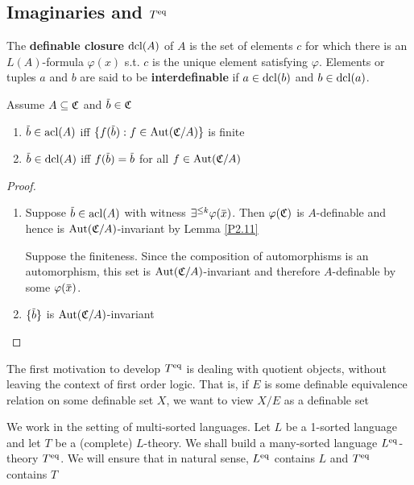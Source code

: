 \documentclass[11pt]{article}
\begin{document}
\subsection{Imaginaries and \texorpdfstring{\(T^{\operatorname{eq}}\)}{Teq}}
\label{sec:org7d287f6}
\begin{definition}[]
The \textbf{definable closure} \(\operatorname{dcl}(A)\) of \(A\) is the set of elements \(c\) for which there is
an \(L(A)\)-formula \(\varphi(x)\) s.t. \(c\) is the unique element satisfying \(\varphi\). Elements or
tuples \(a\) and \(b\) are said to be \textbf{interdefinable} if \(a\in\operatorname{dcl}(b)\) and \(b\in\operatorname{dcl}(a)\).
\end{definition}

\begin{lemma}[]
Assume \(A\subseteq\mathfrak{C}\) and \(\barb\in\fC\)
\begin{enumerate}
\item \(\barb\in\acl(A)\) iff \(\{f(\barb):f\in\Aut(\fC/A)\}\) is finite
\item \(\barb\in\dcl(A)\) iff \(f(\barb)=\barb\) for all \(f\in\operatorname{\text{Aut}}(\mathfrak{C}/A)\)
\end{enumerate}
\end{lemma}

\begin{proof}
\begin{enumerate}
\item Suppose \(\barb\in\acl(A)\) with witness \(\exists^{\le k}\varphi(\barx)\). Then \(\varphi(\mathfrak{C})\) is \(A\)-definable
and hence is \(\operatorname{\text{Aut}}(\mathfrak{C}/A)\)-invariant by Lemma \ref{P2.11}

Suppose the finiteness. Since the composition of automorphisms is an automorphism, this set
is \(\operatorname{\text{Aut}}(\mathfrak{C}/A)\)-invariant and therefore \(A\)-definable by some \(\varphi(\barx)\).

\item \(\{\barb\}\) is \(\operatorname{\text{Aut}}(\mathfrak{C}/A)\)-invariant
\end{enumerate}
\end{proof}

The first motivation to develop \(T^{\operatorname{eq}}\) is dealing with quotient objects, without leaving
the context of first order logic. That is, if \(E\) is some definable equivalence relation on
some definable set \(X\), we want to view \(X/E\) as a definable set

We work in the setting of multi-sorted languages. Let \(L\) be a 1-sorted language and let \(T\)
be a (complete) \(L\)-theory. We shall build a many-sorted
language \(L^{\operatorname{eq}}\)-theory \(T^{\operatorname{eq}}\). We will ensure that in natural sense, \(L^{\operatorname{eq}}\)
contains \(L\) and \(T^{\operatorname{eq}}\) contains \(T\)
\end{document}
